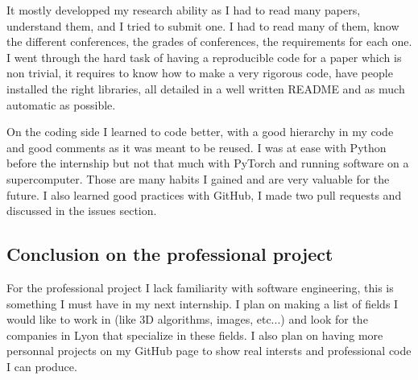 It mostly developped my research ability as I had to read many papers,
understand them, and I tried to submit one. I had to read many of them, know the
different conferences, the grades of conferences, the requirements for each one.
I went through the hard task of having a reproducible code for a paper which is
non trivial, it requires to know how to make a very rigorous code, have people
installed the right libraries, all detailed in a well written README and as much
automatic as possible.

On the coding side I learned to code better, with a good hierarchy in my code
and good comments as it was meant to be reused. I was at ease with Python before
the internship but not that much with PyTorch and running software on a
supercomputer. Those are many habits I gained and are very valuable for the
future. I also learned good practices with GitHub, I made two pull requests and
discussed in the issues section.

\subsection{Conclusion on the professional project}

For the professional project I lack familiarity with software engineering, this
is something I must have in my next internship. I plan on making a list of
fields I would like to work in (like 3D algorithms, images, etc...) and look for
the companies in Lyon that specialize in these fields. I also plan on having
more personnal projects on my GitHub page to show real intersts and professional
code I can produce.